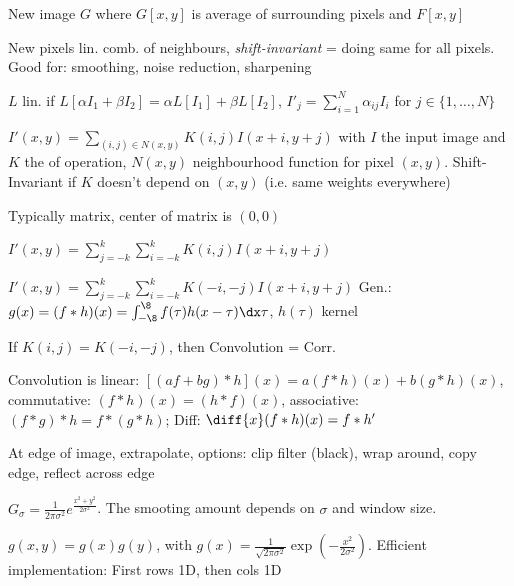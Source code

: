  New image $G$ where $G[x, y]$ is average of surrounding pixels and $F[x, y]$

 New pixels lin. comb. of neighbours, \textit{shift-invariant} = doing same for all pixels.
Good for: smoothing, noise reduction, sharpening

 $L$ lin. if $L[\alpha I_1 + \beta I_2] = \alpha L[I_1] + \beta L[I_2]$, $I'_j = \sum_{i = 1}^{N} \alpha_{ij} I_i$ for $j \in \{ 1, \ldots, N \}$

 $I'(x, y) = \sum_{(i, j) \in N(x, y)} K(i, j) I(x + i, y + j)$ with $I$ the input image and $K$ the  of operation,
$N(x, y)$ neighbourhood function for pixel $(x, y)$. Shift-Invariant if $K$ doesn't depend on $(x, y)$ (i.e. same weights everywhere)

\shortdefinition[Kernel] Typically matrix, center of matrix is $(0, 0)$

\shortdefinition[Correlation] $\displaystyle I'(x, y) = \sum_{j = -k}^{k} \sum_{i = -k}^{k} K(i, j) I(x + i, y + j)$

\shortdefinition[Conv.] $\displaystyle I'(x, y) = \sum_{j = -k}^{k} \sum_{i = -k}^{k} K(-i, -j) I(x + i, y + j)$
Gen.: $g(x) = (f * h)(x) = \int_{-\8}^{\8} f(\tau)h(x - \tau) \dx \tau$, $h(\tau)$ kernel

\shortremark If $K(i, j) = K(-i, -j)$, then Convolution = Corr.

\shortremark Convolution is linear: $[(af + bg) * h](x) = a(f * h)(x) + b(g * h)(x)$, commutative: $(f * h)(x) = (h * f)(x)$,
associative: $(f * g) * h = f * (g * h)$; Diff: $\diff{x} (f * h)(x) = f * h'$


\shortremark At edge of image, extrapolate, options: clip filter (black), wrap around, copy edge, reflect across edge

 $G_\sigma = \frac{1}{2 \pi \sigma^2}e^{\frac{x^2 + y^2}{2\sigma^2}}$.
The smooting amount depends on $\sigma$ and window size.

\shortremark $g(x, y) = g(x) g(y)$, with $g(x) = \frac{1}{\sqrt{2\pi \sigma^2}}\exp\left( -\frac{x^2}{2\sigma^2} \right)$.
Efficient implementation: First rows 1D, then cols 1D
